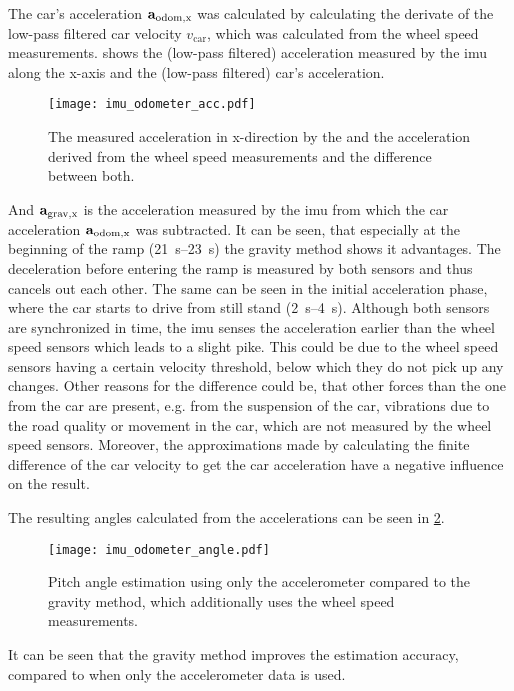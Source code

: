 The car's acceleration $\vb{a}_\mathrm{odom,x} $ was calculated by calculating the derivate of the low-pass filtered car velocity $v_\mathrm{car} $, which was calculated from the wheel speed measurements.
 shows the (low-pass filtered) acceleration measured by the \gls{imu} along the x-axis and the (low-pass filtered) car's acceleration.
\begin{figure}[htb]
    \centering
    \texttt{[image: imu\_odometer\_acc.pdf]}
    \caption[Measured acceleration from  and odometer]{The measured acceleration in x-direction by the  and the acceleration derived from the wheel speed measurements and the difference between both.}
    \label{fig:imu_odometer_acc}
\end{figure}
And $\vb{a}_\mathrm{grav,x} $ is the acceleration measured by the \gls{imu} from which the car acceleration $\vb{a}_\mathrm{odom,x} $ was subtracted.
It can be seen, that especially at the beginning of the ramp (\SIrange{21}{23}{\second}) the gravity method shows it advantages.
The deceleration before entering the ramp is measured by both sensors and thus cancels out each other.
The same can be seen in the initial acceleration phase, where the car starts to drive from still stand (\SIrange[]{2}{4}{\second}).
Although both sensors are synchronized in time, the \gls{imu} senses the acceleration earlier than the wheel speed sensors which leads to a slight pike.
This could be due to the wheel speed sensors having a certain velocity threshold, below which they do not pick up any changes.
Other reasons for the difference could be, that other forces than the one from the car are present, e.g. from the suspension of the car, vibrations due to the road quality or movement in the car, which are not measured by the wheel speed sensors.
Moreover, the approximations made by calculating the finite difference of the car velocity to get the car acceleration have a negative influence on the result.\par
The resulting angles calculated from the accelerations can be seen in \cref{fig:imu_odometer_angle}.
\begin{figure}[htb]
    \centering
    \texttt{[image: imu\_odometer\_angle.pdf]}
    \caption[Angle estimation using the gravity method]{Pitch angle estimation using only the accelerometer compared to the gravity method, which additionally uses the wheel speed measurements.}
    \label{fig:imu_odometer_angle}
\end{figure}
It can be seen that the gravity method improves the estimation accuracy, compared to when only the accelerometer data is used.
